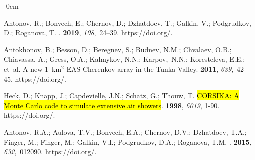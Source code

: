 \documentclass[universe,article,accept,moreauthors,pdftex]{Definitions/mdpi}
\begin{document}
\begin{adjustwidth}{-\extralength}{0cm}
\begin{thebibliography}{999}
Antonov, R.; Bonvech, E.; Chernov, D.; Dzhatdoev, T.; Galkin, V.; Podgrudkov,
  D.; Roganova, T.
.
 {\bf 2019}, {\em 108},~24--39.
\newblock
  https://doi.org/{\href{https://doi.org/10.1016/j.astropartphys.2019.01.002}{}}.

Antokhonov, B.; Besson, D.; Beregnev, S.; Budnev, N.M.; Chvalaev, O.B.; Chiavassa, A.; Gress, O.A.; Kalmykov, N.N.; Karpov,~N.N.; Koresteleva, E.E.; et~al.
\newblock A new 1~km$^2$ {EAS Cherenkov array in the Tunka Valley}.
 {\bf 2011},
  {\em 639},~42--45.
\newblock %
  https://doi.org/{\href{https://doi.org/10.1016/j.nima.2010.09.142}{}}.

Heck, D.; Knapp, J.; Capdevielle, J.N.; Schatz, G.; Thouw, T.
\newblock \hl{CORSIKA: A Monte Carlo code to simulate extensive air showers}.
 {\bf 1998}, \emph{6019}, 1-90. %
https://doi.org/{\href{https://doi.org/10.5445/IR/270043064}{}}.



{Antonov}, R.A.; {Aulova}, T.V.; {Bonvech}, E.A.; {Chernov}, D.V.; {Dzhatdoev},
  T.A.; {Finger}, M.; {Finger}, M.; {Galkin}, V.I.; {Podgrudkov}, D.A.;
  {Roganova}, T.M.
.
 {\bf 2015}, {\em
  632},~012090.
\newblock
  https://doi.org/{\href{https://doi.org/10.1088/1742-6596/632/1/012090}{}}.

\end{thebibliography}


\end{adjustwidth}
\end{document}
